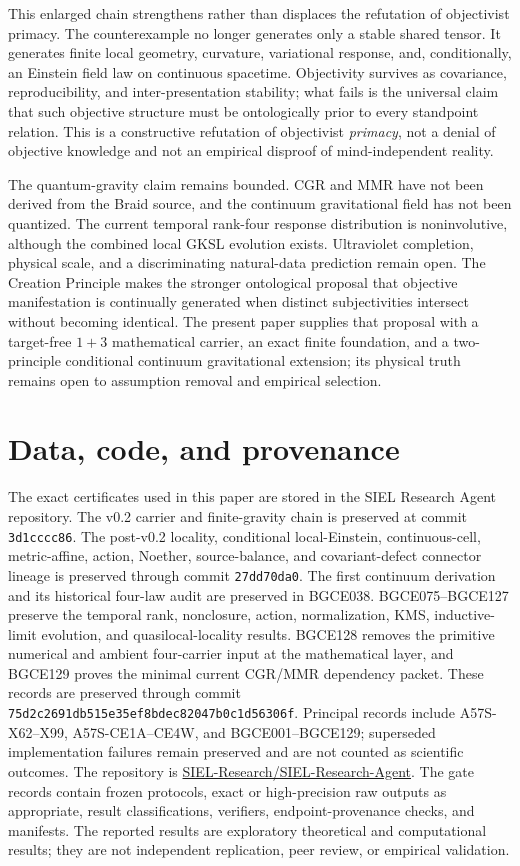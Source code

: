 \documentclass[11pt]{article}
\theoremstyle{definition}
\theoremstyle{remark}
\begin{document}
This enlarged chain strengthens rather than displaces the refutation of objectivist primacy. The counterexample no longer generates only a stable shared tensor. It generates finite local geometry, curvature, variational response, and, conditionally, an Einstein field law on continuous spacetime. Objectivity survives as covariance, reproducibility, and inter-presentation stability; what fails is the universal claim that such objective structure must be ontologically prior to every standpoint relation. This is a constructive refutation of objectivist \emph{primacy}, not a denial of objective knowledge and not an empirical disproof of mind-independent reality.

The quantum-gravity claim remains bounded. CGR and MMR have not been derived from the Braid source, and the continuum gravitational field has not been quantized. The current temporal rank-four response distribution is noninvolutive, although the combined local GKSL evolution exists. Ultraviolet completion, physical scale, and a discriminating natural-data prediction remain open. The Creation Principle makes the stronger ontological proposal that objective manifestation is continually generated when distinct subjectivities intersect without becoming identical. The present paper supplies that proposal with a target-free $1+3$ mathematical carrier, an exact finite foundation, and a two-principle conditional continuum gravitational extension; its physical truth remains open to assumption removal and empirical selection.

\section*{Data, code, and provenance}

The exact certificates used in this paper are stored in the SIEL Research Agent repository. The v0.2 carrier and finite-gravity chain is preserved at commit \texttt{3d1cccc86}. The post-v0.2 locality, conditional local-Einstein, continuous-cell, metric-affine, action, Noether, source-balance, and covariant-defect connector lineage is preserved through commit \texttt{27dd70da0}. The first continuum derivation and its historical four-law audit are preserved in BGCE038. BGCE075--BGCE127 preserve the temporal rank, nonclosure, action, normalization, KMS, inductive-limit evolution, and quasilocal-locality results. BGCE128 removes the primitive numerical and ambient four-carrier input at the mathematical layer, and BGCE129 proves the minimal current CGR/MMR dependency packet. These records are preserved through commit \texttt{75d2c2691db515e35ef8bdec82047b0c1d56306f}. Principal records include A57S-X62--X99, A57S-CE1A--CE4W, and BGCE001--BGCE129; superseded implementation failures remain preserved and are not counted as scientific outcomes. The repository is
\href{https://github.com/SIEL-Research/SIEL-Research-Agent}{SIEL-Research/SIEL-Research-Agent}.
The gate records contain frozen protocols, exact or high-precision raw outputs as appropriate, result classifications, verifiers, endpoint-provenance checks, and manifests. The reported results are exploratory theoretical and computational results; they are not independent replication, peer review, or empirical validation.
\end{document}

